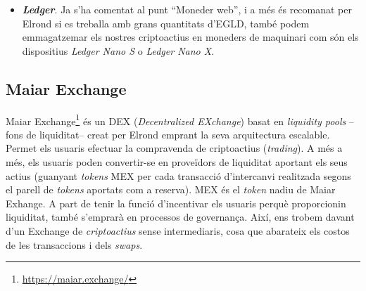 \documentclass[11pt,a4paper]{article}
\begin{document}
\begin{itemize}
\begin{lstlisting}[
    basicstyle=\scriptsize,
]
https://wallet.elrond.com/hook/login?callbackUrl=https://example.com/
\end{lstlisting}
\item \textbf{\textit{Ledger}}. Ja s'ha comentat al punt ``Moneder web'', i a més és recomanat per Elrond si es treballa amb grans quantitats d'EGLD, també podem emmagatzemar els nostres criptoactius en moneders de maquinari com són els dispositius \textit{Ledger Nano S} o \textit{Ledger Nano X}.
\end{itemize}

\subsection{Maiar Exchange}\label{subsec:maiarexchange}
Maiar Exchange\footnote{\url{https://maiar.exchange/}} és un DEX (\textit{Decentralized EXchange}) basat en \textit{liquidity pools} –fons de liquiditat– creat per Elrond emprant la seva arquitectura escalable. Permet els usuaris efectuar la compravenda de criptoactius (\textit{trading}). A més a més, els usuaris poden convertir-se en proveïdors de liquiditat aportant els seus actius (guanyant \textit{tokens} MEX per cada transacció d'intercanvi realitzada segons el parell de \textit{tokens} aportats com a reserva). MEX és el \textit{token} nadiu de Maiar Exhange. A part de tenir la funció d'incentivar els usuaris perquè proporcionin liquiditat, també s'emprarà en processos de governança. Així, ens trobem davant d'un Exchange de \textit{criptoactius} sense intermediaris, cosa que abarateix els costos de les transaccions i dels \textit{swaps}.
\end{document}
